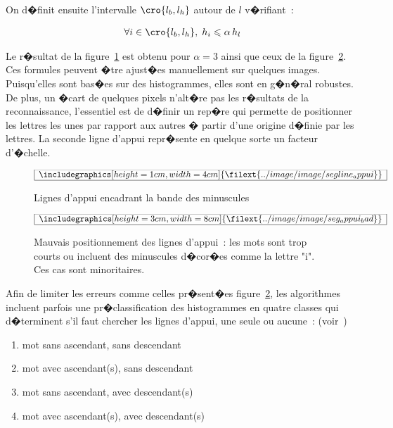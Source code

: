 On d�finit ensuite l'intervalle $\cro{l_b,l_h}$ autour de $l$ v�rifiant~:

            \begin{eqnarray}
            \forall i \in \cro{l_b,l_h}, \; h_i \leqslant \alpha \, h_l
            \end{eqnarray}

Le r�sultat de la figure~\ref{image_ligne_appui_fig} est obtenu pour $\alpha = 3$ ainsi que ceux de la figure~\ref{image_ligne_appui_fig_bad}. Ces formules peuvent �tre ajust�es manuellement sur quelques images. Puisqu'elles sont bas�es sur des histogrammes, elles sont en g�n�ral robustes. De plus, un �cart de quelques pixels n'alt�re pas les r�sultats de la reconnaissance, l'essentiel est de d�finir un rep�re qui permette de positionner les lettres les unes par rapport aux autres � partir d'une origine d�finie par les lettres. La seconde ligne d'appui repr�sente en quelque sorte un facteur d'�chelle.

            \begin{figure}[ht]
        $$\frame{$\begin{array}[c]{c}\includegraphics[height=1cm, width=4cm]
        {\filext{../image/image/segline_appui}}\end{array}$}$$
        \caption{    Lignes d'appui encadrant la bande des minuscules}
        \label{image_ligne_appui_fig}
            \end{figure}

            \begin{figure}[ht]
        $$\frame{$\begin{array}[c]{c}\includegraphics[height=3cm, width=8cm]
        {\filext{../image/image/seg_appui_bad}}\end{array}$}$$
        \caption{    Mauvais positionnement des lignes d'appui~: les mots sont trop courts ou incluent 
                            des minuscules d�cor�es comme la lettre "i". Ces cas sont minoritaires.}
        \label{image_ligne_appui_fig_bad}
            \end{figure}

Afin de limiter les erreurs comme celles pr�sent�es figure~\ref{image_ligne_appui_fig_bad}, les algorithmes incluent parfois une pr�classification des histogrammes en quatre classes qui d�terminent s'il faut chercher les lignes d'appui, une seule ou aucune~: (voir~)

            \begin{enumerate}
            \item mot sans ascendant, sans descendant
            \item mot avec ascendant(s), sans descendant
            \item mot sans ascendant, avec descendant(s)
            \item mot avec ascendant(s), avec descendant(s)
            \end{enumerate}

